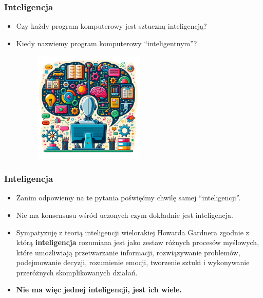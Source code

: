 \documentclass{beamer}
\begin{document}
\begin{frame}[fragile]
\frametitle{Inteligencja}
 \begin{itemize}
\item Czy każdy program komputerowy jest sztuczną inteligencją?
\item Kiedy nazwiemy program komputerowy “inteligentnym”? 

                    \begin{figure}[h]
                        \centering
                        \includegraphics[width=0.5\textwidth]{../../img/inteligentne_programy.png}
                    \end{figure}                    
                    \end{itemize}
\end{frame}

\begin{frame}[fragile]
\frametitle{Inteligencja}
\begin{itemize}
\item Zanim odpowiemy na te pytania poświęćmy chwilę samej “inteligencji”.
\item Nie ma konsensusu wśród uczonych czym dokładnie jest inteligencja. 
\item Sympatyzuję z teorią inteligencji wielorakiej Howarda Gardnera zgodnie z którą \textbf{inteligencja} rozumiana jest jako zestaw różnych procesów myślowych, które umożliwiają przetwarzanie informacji, rozwiązywanie problemów, podejmowanie decyzji, rozumienie emocji, tworzenie sztuki i wykonywanie przeróżnych skomplikowanych działań. 
\item \textbf{Nie ma więc jednej inteligencji, jest ich wiele.} 
\end{itemize}
\end{frame}
\end{document}
